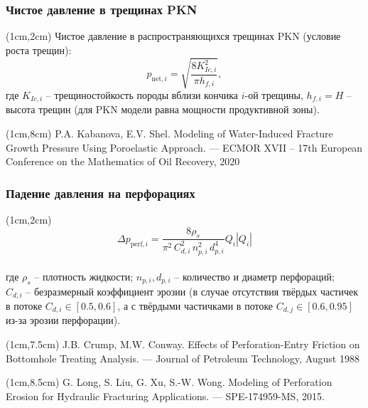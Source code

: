 \documentclass{beamer}
\begin{document}
\begin{frame}
\frametitle{Чистое давление в трещинах PKN}

\begin{textblock*}{11cm}(1cm,2cm)
Чистое давление в распространяющихся трещинах PKN (условие роста трещин):
$$
p_{\text{net},i}=\sqrt{\frac{8K_{Ic,i}^2}{\pi h_{f,i}}},
$$
где $K_{Ic,i}$ -- трещиностойкость породы вблизи кончика $i$-ой трещины,\newline
$h_{f,i}=H$ -- высота трещин (для PKN модели равна мощности продуктивной зоны).
\end{textblock*}

\begin{textblock*}{11cm}(1cm,8cm)
\scriptsize
\textcolor{lit_gray}{P.A. Kabanova, E.V. Shel. Modeling of Water-Induced Fracture Growth Pressure Using Poroelastic Approach. — ECMOR XVII – 17th European Conference on the Mathematics of Oil Recovery, 2020}
\end{textblock*}
\normalsize

\end{frame}


\begin{frame}
\frametitle{Падение давления на перфорациях}
\begin{textblock*}{11cm}(1cm,2cm)
$$
\Delta p_{\text{perf},i}=\frac{8\rho_s}{\pi^2\,C_{d,i}^2\,n_{p,i}^2 \,d_{p,i}^4}Q_i\left|Q_i\right|
$$\\
где $\rho_s$ -- плотность жидкости;\newline
$n_{p,i}, d_{p,i}$ -- количество и диаметр перфораций;\newline\\
$C_{d,i}$ -- безразмерный коэффициент эрозии (в случае отсутствия твёрдых частичек в потоке $C_{d,i}\in\left[0.5,0.6\right]$, а с твёрдыми частичками в потоке $C_{d,j}\in\left[0.6,0.95\right]$  из-за эрозии перфорации).
\end{textblock*}

\begin{textblock*}{11cm}(1cm,7.5cm)
\scriptsize
\textcolor{lit_gray}{J.B. Crump, M.W. Conway. Effects of Perforation-Entry Friction on Bottomhole Treating Analysis. — Journal of Petroleum Technology, August 1988}
\end{textblock*}

\begin{textblock*}{11cm}(1cm,8.5cm)
\scriptsize
\textcolor{lit_gray}{G. Long, S. Liu, G. Xu, S.-W. Wong. Modeling of Perforation Erosion for Hydraulic Fracturing Applications. — SPE-174959-MS, 2015.}
\end{textblock*}

\normalsize

\end{frame}
\end{document}
